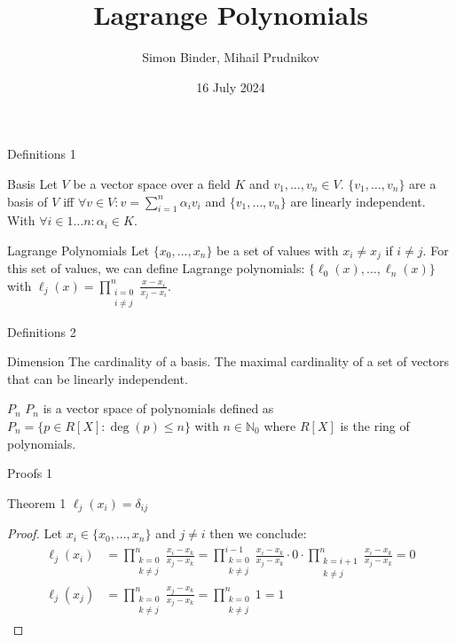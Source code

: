 \documentclass[8pt]{beamer}
\title{Lagrange Polynomials}
\date{16 July 2024}
\author{Simon Binder, Mihail Prudnikov}
\begin{document}
	\begin{frame}[plain]
		\maketitle
	\end{frame}
	
	\begin{frame}{Definitions 1}
		\begin{block}{Basis}
			Let $V$ be a vector space over a field $K$ and $v_1, \ldots, v_n \in V$. $\{ v_1, \ldots, v_n\} $ are a basis of $V$ iff $\forall v \in V: v = \sum_{i=1}^{n}\alpha_i v_i$ and $\{ v_1, \ldots, v_n\}$ are linearly independent. With $\forall i \in 1 \ldots n: \alpha_i \in K$.
		\end{block}
		\begin{block}{Lagrange Polynomials}
			Let $\{x_0, \ldots, x_n \}$ be a set of values with $x_i \neq x_j$ if $i \neq j$. For this set of values, we can define Lagrange polynomials: $\{\ell_0(x), \ldots, \ell_n(x)\}$ with $\ell_j(x) = 
			\displaystyle \prod_{\substack{i= 0 \\ i \neq j }}^{n}\frac{x - x_i}{x_j - x_i}$. 
		\end{block}
	\end{frame}
	
	\begin{frame}{Definitions 2}
		\begin{block}{Dimension}
			The cardinality of a basis. The maximal cardinality of a set of vectors that can be linearly independent. 
		\end{block}
		\begin{block}{$P_n$}
			$P_n$ is a vector space of polynomials defined as $P_n = \{p \in R[X] : \deg(p) \leq n \}$ with $n \in \mathbb{N}_0$ where $R[X]$ is the ring of polynomials.
		\end{block}
	\end{frame}
	
	\begin{frame}{Proofs 1}
		\begin{block}{Theorem 1}
			$\ell_j(x_i) = \delta_{ij}$
		\end{block}
		\begin{proof}
			Let $x_i \in \{x_0, \ldots, x_n \}$ and $j \neq i$ then we conclude: 
			\begin{align*}
				\ell_j(x_i) &= \prod_{\substack{k= 0 \\ k \neq j }}^{n}\frac{x_i - x_k}{x_j - x_k} = \prod_{\substack{k= 0 \\ k \neq j}}^{i-1}\frac{x_i - x_k}{x_j - x_k} \cdot 0 \cdot \prod_{\substack{k= i+1 \\ k \neq j}}^{n}\frac{x_i - x_k}{x_j - x_k} = 0 \\
				\ell_j(x_j) &= \prod_{\substack{k= 0 \\ k \neq j }}^{n}\frac{x_j - x_k}{x_j - x_k} =  \prod_{\substack{k= 0 \\ k \neq j }}^{n} 1 = 1
			\end{align*}
		\end{proof}
		\end{frame}
			
\end{document}
